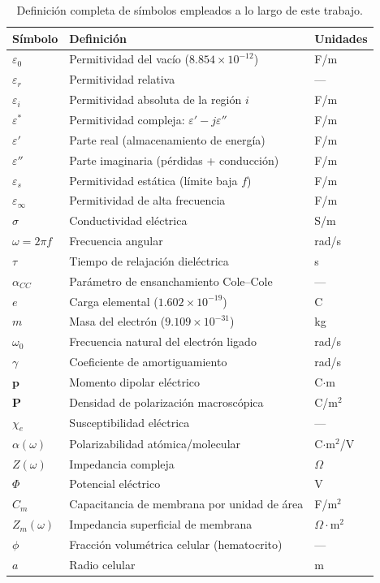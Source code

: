 \documentclass[12pt]{article}
\begin{document}
\begin{table}[H]
\centering
\caption{Definici\'on completa de s\'imbolos empleados a lo largo de este trabajo.}
\label{tab:simbolos}
\renewcommand{\arraystretch}{1.3}
\begin{tabular}{@{}lll@{}}
\toprule
\textbf{S\'imbolo} & \textbf{Definici\'on} & \textbf{Unidades} \\
\midrule
$\varepsilon_0$ & Permitividad del vac\'io ($8.854\times10^{-12}$) & F/m \\
$\varepsilon_r$ & Permitividad relativa & --- \\
$\varepsilon_i$ & Permitividad absoluta de la regi\'on $i$ & F/m \\
$\varepsilon^*$ & Permitividad compleja: $\varepsilon' - j\varepsilon''$ & F/m \\
$\varepsilon'$ & Parte real (almacenamiento de energ\'ia) & F/m \\
$\varepsilon''$ & Parte imaginaria (p\'erdidas + conducci\'on) & F/m \\
$\varepsilon_s$ & Permitividad est\'atica (l\'imite baja $f$) & F/m \\
$\varepsilon_\infty$ & Permitividad de alta frecuencia & F/m \\
$\sigma$ & Conductividad el\'ectrica & S/m \\
$\omega = 2\pi f$ & Frecuencia angular & rad/s \\
$\tau$ & Tiempo de relajaci\'on diel\'ectrica & s \\
$\alpha_{CC}$ & Par\'ametro de ensanchamiento Cole--Cole & --- \\
$e$ & Carga elemental ($1.602\times10^{-19}$) & C \\
$m$ & Masa del electr\'on ($9.109\times10^{-31}$) & kg \\
$\omega_0$ & Frecuencia natural del electr\'on ligado & rad/s \\
$\gamma$ & Coeficiente de amortiguamiento & rad/s \\
$\mathbf{p}$ & Momento dipolar el\'ectrico & C$\cdot$m \\

$\mathbf{P}$ & Densidad de polarizaci\'on macrosc\'opica & C/m$^2$ \\
$\chi_e$ & Susceptibilidad el\'ectrica & --- \\
$\alpha(\omega)$ & Polarizabilidad at\'omica/molecular & C$\cdot$m$^2$/V \\
$Z(\omega)$ & Impedancia compleja & $\Omega$ \\
$\Phi$ & Potencial el\'ectrico & V \\
$C_m$ & Capacitancia de membrana por unidad de \'area & F/m$^2$ \\
$Z_m(\omega)$ & Impedancia superficial de membrana & $\Omega\cdot$m$^2$ \\
$\phi$ & Fracci\'on volum\'etrica celular (hematocrito) & --- \\
$a$ & Radio celular & m \\
\bottomrule
\end{tabular}
\end{table}
\end{document}
